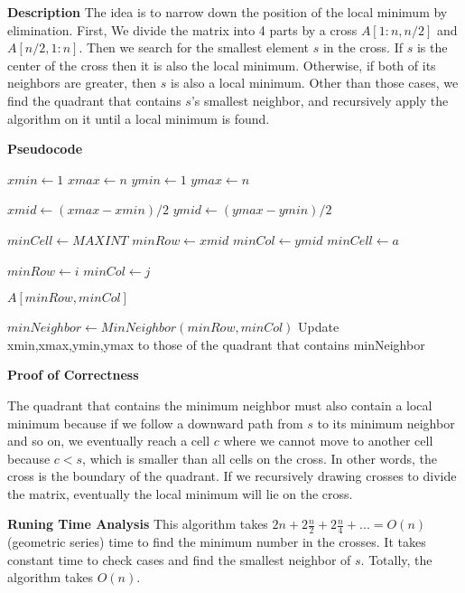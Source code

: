 \documentclass[12pt,article]{article}
\begin{document}
\textbf{Description}
The idea is to narrow down the position of the local minimum by elimination. First, We divide the matrix into 4 parts by a cross $A[1:n, n/2]$ and $A[n/2, 1:n]$. Then we search for the smallest element $s$ in the cross. If $s$ is the center of the cross then it is also the local minimum. Otherwise, if both of its neighbors are greater, then $s$ is also a local minimum. Other than those cases, we find the quadrant that contains $s$'s smallest neighbor, and recursively apply the algorithm on it until a local minimum is found.

\textbf{Pseudocode}

\begin{algorithm}
\caption{$LM(A[1:n,1:n]),k$}\label{alg:q4}
\begin{algorithmic}
    \State $xmin \gets 1$
    \State $xmax \gets n$
    \State $ymin \gets 1$
    \State $ymax \gets n$
    
        \State $xmid \gets (xmax - xmin) / 2$
        \State $ymid \gets (ymax - ymin) / 2$

        \State $minCell \gets MAXINT$
        \State $minRow \gets xmid$
        \State $minCol \gets ymid$
                \State $minCell \gets a$

                \State $minRow \gets i$
                \State $minCol \gets j$
            \EndIf
        \EndFor

            \Return $A[minRow,minCol]$
        \EndIf

        \State $minNeighbor \gets MinNeighbor(minRow,minCol)$
        \State Update xmin,xmax,ymin,ymax to those of the quadrant that contains minNeighbor

    \EndWhile
\end{algorithmic}
\end{algorithm}

\textbf{Proof of Correctness}

The quadrant that contains the minimum neighbor must also contain a local minimum because if we follow a downward path from $s$ to its minimum neighbor and so on, we eventually reach a cell $c$ where we cannot move to another cell because $c < s$, which is smaller than all cells on the cross. In other words, the cross is the boundary of the quadrant. If we recursively drawing crosses to divide the matrix, eventually the local minimum will lie on the cross.

\textbf{Runing Time Analysis}
This algorithm takes $2n + 2\frac{n}{2} + 2\frac{n}{4} + ... = O(n)$ (geometric series) time to find the minimum number in the crosses. It takes constant time to check cases and find the smallest neighbor of $s$. Totally, the algorithm takes $O(n)$.



\end{document}

